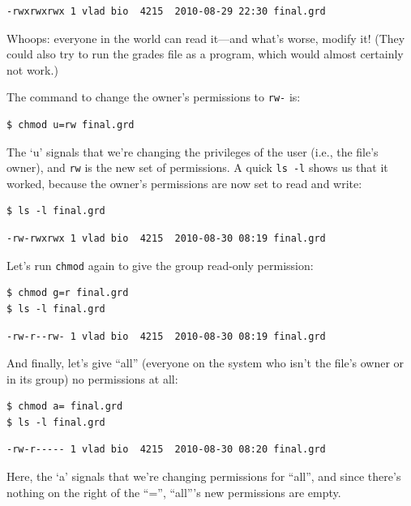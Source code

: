 \documentclass{book}
\begin{document}
\begin{verbatim}
-rwxrwxrwx 1 vlad bio  4215  2010-08-29 22:30 final.grd
\end{verbatim}

Whoops: everyone in the world can read it---and what's worse, modify it!
(They could also try to run the grades file as a program, which would
almost certainly not work.)

The command to change the owner's permissions to \texttt{rw-} is:

\begin{verbatim}
$ chmod u=rw final.grd
\end{verbatim}

The `u' signals that we're changing the privileges of the user (i.e.,
the file's owner), and \texttt{rw} is the new set of permissions. A
quick \texttt{ls -l} shows us that it worked, because the owner's
permissions are now set to read and write:

\begin{verbatim}
$ ls -l final.grd
\end{verbatim}

\begin{verbatim}
-rw-rwxrwx 1 vlad bio  4215  2010-08-30 08:19 final.grd
\end{verbatim}

Let's run \texttt{chmod} again to give the group read-only permission:

\begin{verbatim}
$ chmod g=r final.grd
$ ls -l final.grd
\end{verbatim}

\begin{verbatim}
-rw-r--rw- 1 vlad bio  4215  2010-08-30 08:19 final.grd
\end{verbatim}

And finally, let's give ``all'' (everyone on the system who isn't the
file's owner or in its group) no permissions at all:

\begin{verbatim}
$ chmod a= final.grd
$ ls -l final.grd
\end{verbatim}

\begin{verbatim}
-rw-r----- 1 vlad bio  4215  2010-08-30 08:20 final.grd
\end{verbatim}

Here, the `a' signals that we're changing permissions for ``all'', and
since there's nothing on the right of the ``='', ``all'''s new
permissions are empty.
\end{document}
